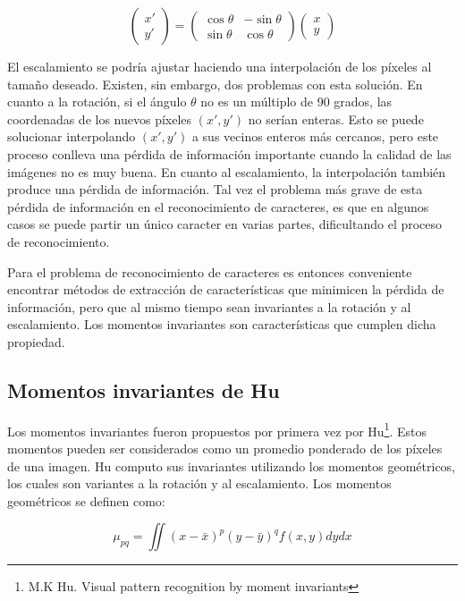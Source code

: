 \documentclass[a4paper, 11pt, oneside]{report}
\begin{document}
	\[
		\begin{pmatrix} 
			x' \\ y'
		\end{pmatrix}
		=
		\begin{pmatrix} 
			\cos\theta & -\sin\theta \\
			\sin\theta & \cos\theta
		\end{pmatrix}
		\begin{pmatrix} 
			x \\ y
		\end{pmatrix}
	\]

El escalamiento se podría ajustar haciendo una interpolación de los píxeles al tamaño deseado. Existen, sin embargo, dos problemas con esta solución. En cuanto a la rotación, si el ángulo $\theta$ no es un múltiplo de 90 grados, las coordenadas de los nuevos píxeles $(x', y')$ no serían enteras. Esto se puede solucionar interpolando $(x',y')$ a sus vecinos enteros más cercanos, pero este proceso conlleva una pérdida de información importante cuando la calidad de las imágenes no es muy buena. En cuanto al escalamiento, la interpolación también produce una pérdida de información. Tal vez el problema más grave de esta pérdida de información en el reconocimiento de caracteres, es que en algunos casos se puede partir un único caracter en varias partes, dificultando el proceso de reconocimiento.

Para el problema de reconocimiento de caracteres es entonces conveniente encontrar métodos de extracción de características que minimicen la pérdida de información, pero que al mismo tiempo sean invariantes a la rotación y al escalamiento. Los momentos invariantes son características que cumplen dicha propiedad.

\subsection{Momentos invariantes de Hu}	
\label{sect:invariants}

Los momentos invariantes fueron propuestos por primera vez por Hu\footnote{M.K Hu. Visual pattern recognition by moment invariants}. Estos momentos pueden ser considerados como un promedio ponderado de los píxeles de una imagen. Hu computo sus invariantes utilizando los momentos geométricos, los cuales son variantes a la rotación y al escalamiento. Los momentos geométricos se definen como:

	\begin{equation}\label{eq1}
		\mu_{pq} = \iint{ {(x-\bar{x})^p} {(y-\bar{y})^q} f(x,y) dy dx }
	\end{equation}
\end{document}
